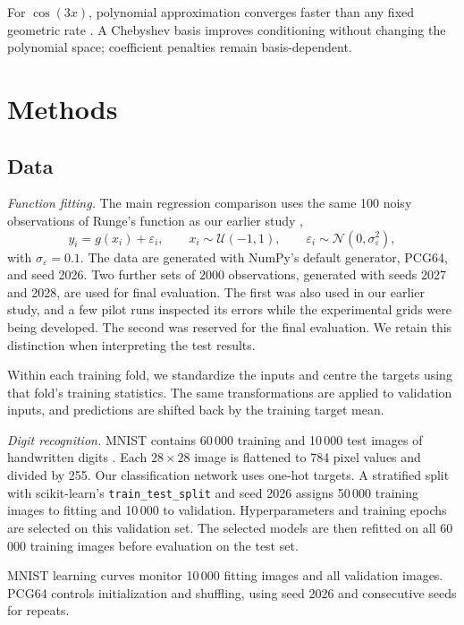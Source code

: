 \documentclass[aps,prb,reprint,superscriptaddress,nofootinbib,longbibliography,floatfix]{revtex4-2}
\begin{document}
For $\cos(3x)$, polynomial approximation converges faster than any fixed geometric rate \cite[Chap.~8]{Trefethen2019}. A Chebyshev basis improves conditioning without changing the polynomial space; coefficient penalties remain basis-dependent.

\section{Methods}\label{sec:methods}

\subsection{Data}\label{sec:data}
\emph{Function fitting.}
The main regression comparison uses the same 100 noisy observations of Runge's function as our earlier study \cite{Ozdber2026},
\[
y_i=g(x_i)+\varepsilon_i,
\qquad
x_i\sim\mathcal U(-1,1),
\qquad
\varepsilon_i\sim\mathcal N(0,\sigma_\varepsilon^2),
\]
with $\sigma_\varepsilon=0.1$. The data are generated with NumPy's default generator, PCG64, and seed 2026. Two further sets of 2000 observations, generated with seeds 2027 and 2028, are used for final evaluation. The first was also used in our earlier study, and a few pilot runs inspected its errors while the experimental grids were being developed. The second was reserved for the final evaluation. We retain this distinction when interpreting the test results.

Within each training fold, we standardize the inputs and centre the targets using that fold's training statistics. The same transformations are applied to validation inputs, and predictions are shifted back by the training target mean.

\emph{Digit recognition.}
MNIST contains 60\,000 training and 10\,000 test images of handwritten digits \cite{LeCun2010}. Each $28\times28$ image is flattened to 784 pixel values and divided by 255. Our classification network uses one-hot targets. A stratified split with scikit-learn's \texttt{train\_test\_split} and seed 2026 assigns 50\,000 training images to fitting and 10\,000 to validation. Hyperparameters and training epochs are selected on this validation set. The selected models are then refitted on all 60\,000 training images before evaluation on the test set.

MNIST learning curves monitor 10\,000 fitting images and all validation images. PCG64 controls initialization and shuffling, using seed 2026 and consecutive seeds for repeats.
\end{document}
